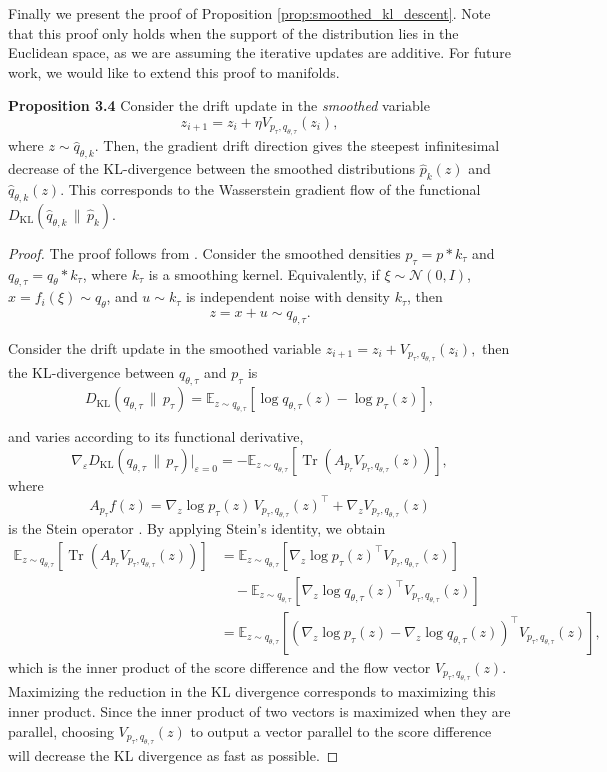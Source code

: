 \documentclass{article}
\theoremstyle{plain}
\begin{document}
Finally we present the proof of Proposition \ref{prop:smoothed_kl_descent}. Note that this proof only holds when the support of the distribution lies in the Euclidean space, as we are assuming the iterative updates are additive. For future work, we would like to extend this proof to manifolds. 

\textbf{Proposition 3.4}  Consider the drift update in the \textit{smoothed} variable \[z_{i+1}=z_i + \eta V_{p_\tau,q_{\theta,\tau}}(z_i),\] where  $z\sim \hat q_{\theta,k}.$  Then, the gradient drift direction gives the steepest infinitesimal decrease of the KL-divergence between the smoothed distributions $\hat p_k (z)$ and $\hat q_{\theta,k} (z)$. This corresponds to the Wasserstein gradient flow of the functional $D_{\mathrm{KL}}(\hat q_{\theta,k} \,\|\, \hat p_k)$.

\begin{proof}
The proof follows from \cite{weber2023score}. Consider the smoothed densities \(p_\tau=p * k_\tau\) and
\(q_{\theta,\tau}=q_\theta * k_\tau\), where \(k_\tau\) is a smoothing kernel.
Equivalently, if \(\xi\sim \mathcal{N}(0,I)\), \(x=f_i(\xi)\sim q_\theta\),
and \(u\sim k_\tau\) is independent noise with density \(k_\tau\), then
\[
z=x+u \sim q_{\theta,\tau}.
\]

Consider the drift update in the smoothed variable $z_{i+1}=z_i +V_{p_\tau,q_{\theta,\tau}}(z_i),$ 
then the KL-divergence between \(q_{\theta,\tau}\) and \(p_\tau\) is
\[
D_{\mathrm{KL}}(q_{\theta,\tau} \,\|\, p_\tau)
= \mathbb{E}_{z \sim q_{\theta,\tau}}
\left[
\log q_{\theta,\tau}(z) - \log p_\tau(z)
\right],
\]

and varies according to its functional derivative,
\[
\nabla_\varepsilon D_{\mathrm{KL}}(q_{\theta,\tau} \,\|\, p_\tau)\big|_{\varepsilon=0}
= - \mathbb{E}_{z \sim q_{\theta,\tau}}
\left[
\operatorname{Tr}(A_{p_\tau} V_{p_\tau,q_{\theta,\tau}}(z))
\right],
\]
where
\[
A_{p_\tau} f(z)
=
\nabla_z \log p_\tau(z)\,
V_{p_\tau,q_{\theta,\tau}}(z)^\top
+
\nabla_z V_{p_\tau,q_{\theta,\tau}}(z)
\]
is the Stein operator \citep{gorham2015measuring}. By applying Stein’s identity, we obtain
\[
\begin{aligned}
\mathbb{E}_{z \sim q_{\theta,\tau}}
\!\left[
\operatorname{Tr}(A_{p_\tau} V_{p_\tau,q_{\theta,\tau}}(z))
\right]
&=
\mathbb{E}_{z \sim q_{\theta,\tau}}
\!\left[
\nabla_z \log p_\tau(z)^\top V_{p_\tau,q_{\theta,\tau}}(z)
\right] \\
&\quad -
\mathbb{E}_{z \sim q_{\theta,\tau}}
\!\left[
\nabla_z \log q_{\theta,\tau}(z)^\top V_{p_\tau,q_{\theta,\tau}}(z)
\right] \\
&=
\mathbb{E}_{z \sim q_{\theta,\tau}}
\!\left[
\left(
\nabla_z \log p_\tau(z)
-
\nabla_z \log q_{\theta,\tau}(z)
\right)^\top
V_{p_\tau,q_{\theta,\tau}}(z)
\right],
\end{aligned}
\]
which is the inner product of the score difference and the flow vector
\(V_{p_\tau,q_{\theta,\tau}}(z)\). Maximizing the reduction in the KL divergence
corresponds to maximizing this inner product. Since the inner product of two
vectors is maximized when they are parallel, choosing
\(V_{p_\tau,q_{\theta,\tau}}(z)\) to output a vector parallel to the score
difference will decrease the KL divergence as fast as possible.
\end{proof}
\end{document}
